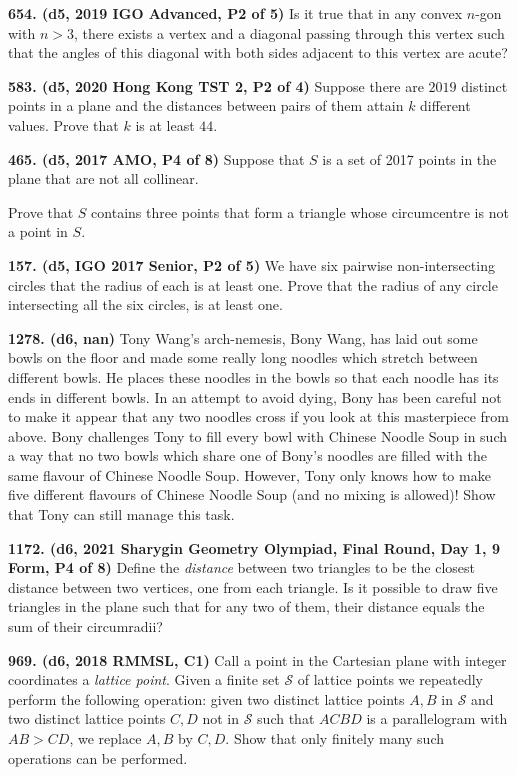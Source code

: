 \documentclass{article}
\begin{document}
\textbf{654. (\color{red}d5\color{black}, 2019 IGO Advanced, P2 of 5)} Is it true that in any convex $n$-gon with $n > 3$, there exists a vertex and a diagonal passing through this vertex such that the angles of this diagonal with both sides adjacent to this vertex are acute?

\textbf{583. (\color{red}d5\color{black}, 2020 Hong Kong TST 2, P2 of 4)} Suppose there are $2019$ distinct points in a plane and the distances between pairs of them attain $k$ different values. Prove that $k$ is at least $44$.

\textbf{465. (\color{red}d5\color{black}, 2017 AMO, P4 of 8)} Suppose that $S$ is a set of 2017 points in the plane that are not all collinear.

Prove that $S$ contains three points that form a triangle whose circumcentre is not a point in $S$.

\textbf{157. (\color{red}d5\color{black}, IGO 2017 Senior, P2 of 5)} We have six pairwise non-intersecting circles that the radius of each is at least one. Prove that the radius of any circle intersecting all the six circles, is at least one.

\textbf{1278. (\color{red}d6\color{black}, nan)} Tony Wang's arch-nemesis, Bony Wang, has laid out some bowls on the floor and made some really long noodles which stretch between different bowls. He places these noodles in the bowls so that each noodle has its ends in different bowls. In an attempt to avoid dying, Bony has been careful not to make it appear that any two noodles cross if you look at this masterpiece from above. Bony challenges Tony to fill every bowl with Chinese Noodle Soup in such a way that no two bowls which share one of Bony's noodles are filled with the same flavour of Chinese Noodle Soup. However, Tony only knows how to make five different flavours of Chinese Noodle Soup (and no mixing is allowed)! Show that Tony can still manage this task.

\textbf{1172. (\color{red}d6\color{black}, 2021 Sharygin Geometry Olympiad, Final Round, Day 1, 9 Form, P4 of 8)} Define the \emph{distance} between two triangles to be the closest distance between two vertices, one from each triangle. Is it possible to draw five triangles in the plane such that for any two of them, their distance equals the sum of their circumradii?

\textbf{969. (\color{red}d6\color{black}, 2018 RMMSL, C1)} Call a point in the Cartesian plane with integer coordinates a \textit{lattice point}. Given a finite set $\mathcal{S}$ of lattice points we repeatedly perform the following operation: given two distinct lattice points $A, B$ in $\mathcal{S}$ and two distinct lattice points $C, D$ not in $\mathcal{S}$ such that $ACBD$ is a parallelogram with $AB > CD$, we replace $A, B$ by $C, D$. Show that only finitely many such operations can be performed.
\end{document}
